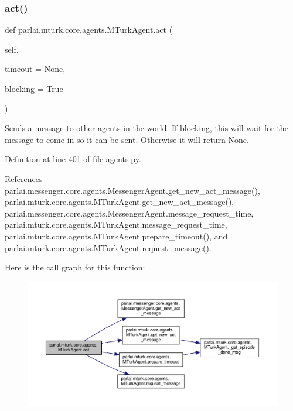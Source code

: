 \subsubsection{\texorpdfstring{act()}{act()}}
{\footnotesize\ttfamily def parlai.\+mturk.\+core.\+agents.\+M\+Turk\+Agent.\+act (\begin{DoxyParamCaption}\item[{}]{self,  }\item[{}]{timeout = {\ttfamily None},  }\item[{}]{blocking = {\ttfamily True} }\end{DoxyParamCaption})}

\begin{DoxyVerb}Sends a message to other agents in the world. If blocking, this
will wait for the message to come in so it can be sent. Otherwise
it will return None.
\end{DoxyVerb}
 

Definition at line 401 of file agents.\+py.



References parlai.\+messenger.\+core.\+agents.\+Messenger\+Agent.\+get\+\_\+new\+\_\+act\+\_\+message(), parlai.\+mturk.\+core.\+agents.\+M\+Turk\+Agent.\+get\+\_\+new\+\_\+act\+\_\+message(), parlai.\+messenger.\+core.\+agents.\+Messenger\+Agent.\+message\+\_\+request\+\_\+time, parlai.\+mturk.\+core.\+agents.\+M\+Turk\+Agent.\+message\+\_\+request\+\_\+time, parlai.\+mturk.\+core.\+agents.\+M\+Turk\+Agent.\+prepare\+\_\+timeout(), and parlai.\+mturk.\+core.\+agents.\+M\+Turk\+Agent.\+request\+\_\+message().

Here is the call graph for this function\+:
\nopagebreak
\begin{figure}[H]
\begin{center}
\leavevmode
\includegraphics[width=350pt]{classparlai_1_1mturk_1_1core_1_1agents_1_1MTurkAgent_ace5f52c7d5532def64ed17737d2ce00c_cgraph}
\end{center}
\end{figure}
\mbox{\label{classparlai_1_1mturk_1_1core_1_1agents_1_1MTurkAgent_aecba90740204ffc85d23649568b7eec0}} 
